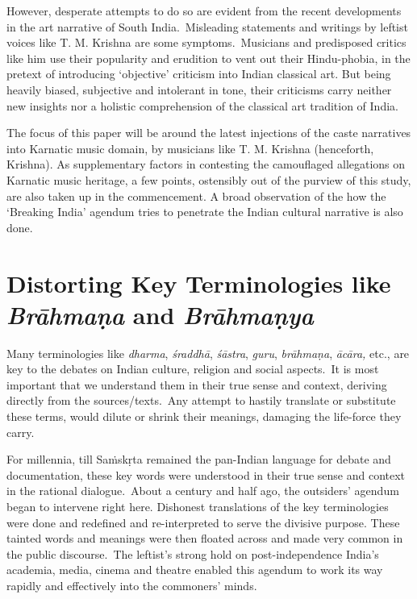 However, desperate attempts to do so are evident from the recent developments in the art narrative of South India.~Misleading statements and writings by leftist voices like T. M. Krishna are some symptoms.~Musicians and predisposed critics like him use their popularity and erudition to vent out their Hindu-phobia, in the pretext of introducing ‘objective’ criticism into Indian classical art. But being heavily biased, subjective and intolerant in tone, their criticisms carry neither new insights nor a holistic comprehension of the classical art tradition of India.

The focus of this paper will be around the latest injections of the caste narratives into Karnatic music domain, by musicians like T. M. Krishna (henceforth, Krishna). As supplementary factors in contesting the camouflaged allegations on Karnatic music heritage, a few points, ostensibly out of the purview of this study, are also taken up in the commencement. A broad observation of the how the ‘Breaking India’ agendum tries to penetrate the Indian cultural narrative is also done.

\vspace{-.5cm}

\section*{Distorting Key Terminologies like \textit{Brāhmaṇa} and \textit{Brāhmaṇya}}

\vspace{-.2cm}

Many terminologies like \textit{dharma}, \textit{śraddhā}, \textit{śāstra}, \textit{guru}, \textit{brāhmaṇa}, \textit{ācāra,} etc., are key to the debates on Indian culture, religion and social aspects.~It is most important that we understand them in their true sense and context, deriving directly from the sources/texts.~Any attempt to hastily translate or substitute these terms, would dilute or shrink their meanings, damaging the life-force they carry.

For millennia, till Saṁskṛta remained the pan-Indian language for debate and documentation, these key words were understood in their true sense and context in the rational dialogue.~About a century and half ago, the outsiders’ agendum began to intervene right here. Dishonest translations of the key terminologies were done and redefined and re-interpreted to serve the divisive purpose. These tainted words and meanings were then floated across and made very common in the public discourse.~The leftist’s strong hold on post-independence India’s academia, media, cinema and theatre enabled this agendum to work its way rapidly and effectively into the commoners’ minds.

